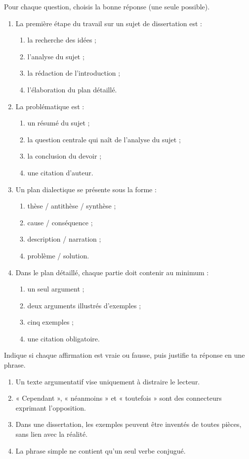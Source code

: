 \documentclass[11pt]{article}
\begin{document}
\begin{exercice}
Pour chaque question, choisis la bonne réponse (une seule possible).
\begin{enumerate}
\item La première étape du travail sur un sujet de dissertation est :
\begin{enumerate}
\item la recherche des idées ; \item l'analyse du sujet ; \item la rédaction de l'introduction ; \item l'élaboration du plan détaillé.
\end{enumerate}
\item La problématique est :
\begin{enumerate}
\item un résumé du sujet ; \item la question centrale qui naît de l'analyse du sujet ; \item la conclusion du devoir ; \item une citation d'auteur.
\end{enumerate}
\item Un plan dialectique se présente sous la forme :
\begin{enumerate}
\item thèse / antithèse / synthèse ; \item cause / conséquence ; \item description / narration ; \item problème / solution.
\end{enumerate}
\item Dans le plan détaillé, chaque partie doit contenir au minimum :
\begin{enumerate}
\item un seul argument ; \item deux arguments illustrés d'exemples ; \item cinq exemples ; \item une citation obligatoire.
\end{enumerate}
\end{enumerate}
\end{exercice}

\begin{exercice}
Indique si chaque affirmation est vraie ou fausse, puis justifie ta réponse en une phrase.
\begin{enumerate}
\item Un texte argumentatif vise uniquement à distraire le lecteur.
\item « Cependant », « néanmoins » et « toutefois » sont des connecteurs exprimant l'opposition.
\item Dans une dissertation, les exemples peuvent être inventés de toutes pièces, sans lien avec la réalité.
\item La phrase simple ne contient qu'un seul verbe conjugué.
\end{enumerate}
\end{exercice}
\end{document}
